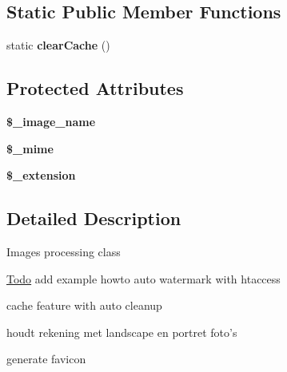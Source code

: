 \subsection*{Static Public Member Functions}
\begin{DoxyCompactItemize}
\item 
\hypertarget{class_image_processor_af5b55597bf6435397d8a7f6f6b3a2fbc}{
static {\bfseries clearCache} ()}
\label{class_image_processor_af5b55597bf6435397d8a7f6f6b3a2fbc}

\end{DoxyCompactItemize}
\subsection*{Protected Attributes}
\begin{DoxyCompactItemize}
\item 
\hypertarget{class_image_processor_afed9aac4fb3e2b4586e9215651abe1c1}{
{\bfseries \$\_\-image\_\-name}}
\label{class_image_processor_afed9aac4fb3e2b4586e9215651abe1c1}

\item 
\hypertarget{class_image_processor_acd8b3fcd9c909d4704159fc7438eaa99}{
{\bfseries \$\_\-mime}}
\label{class_image_processor_acd8b3fcd9c909d4704159fc7438eaa99}

\item 
\hypertarget{class_image_processor_a5c8824e9846349e9d3f49db20184f6db}{
{\bfseries \$\_\-extension}}
\label{class_image_processor_a5c8824e9846349e9d3f49db20184f6db}

\end{DoxyCompactItemize}


\subsection{Detailed Description}
Images processing class

\begin{Desc}
\item[\hyperlink{todo__todo000001}{Todo}]add example howto auto watermark with htaccess 

cache feature with auto cleanup 

houdt rekening met landscape en portret foto's 

generate favicon\end{Desc}



